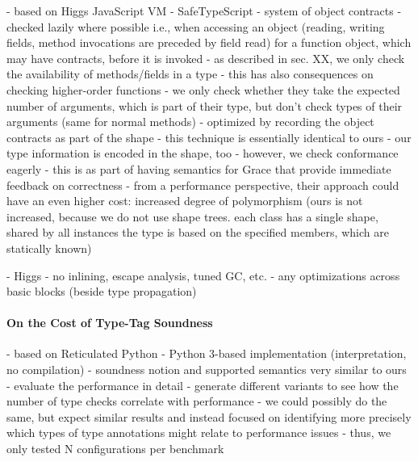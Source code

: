 \begin{cnote}
- based on Higgs JavaScript VM
- SafeTypeScript
  - system of object contracts
  - checked lazily where possible
    i.e., when accessing an object (reading, writing fields, method invocations are preceded by field read)
    for a function object, which may have contracts, before it is invoked
  - as described in sec. XX, we only check the availability of methods/fields
    in a type
    - this has also consequences on checking higher-order functions
      - we only check whether they take the expected number of arguments,
        which is part of their type, but don't check types of their arguments
        (same for normal methods)
  - optimized by recording the object contracts as part of the shape
  - this technique is essentially identical to ours
    - our type information is encoded in the shape, too
    - however, we check conformance eagerly
      - this is as part of having semantics for Grace that provide immediate
        feedback on correctness
    - from a performance perspective, their approach could have an even higher
      cost: increased degree of polymorphism (ours is not increased,
      because we do not use shape trees.
      each class has a single shape, shared by all instances
      the type is based on the specified members, which are statically known)

- Higgs
  - no inlining, escape analysis, tuned GC, etc.
  - any optimizations across basic blocks (beside type propagation)

\end{cnote}


\paragraph{On the Cost of Type-Tag Soundness}
\begin{cnote}
- based on Reticulated Python
  - Python 3-based implementation (interpretation, no compilation)
- soundness notion and supported semantics very similar to ours
- evaluate the performance in detail
 - generate different variants to see how the number of type checks correlate
   with performance
 - we could possibly do the same, but expect similar results and instead
   focused on identifying more precisely which types of type annotations
   might relate to performance issues
   - thus, we only tested N configurations per benchmark
\end{cnote}

